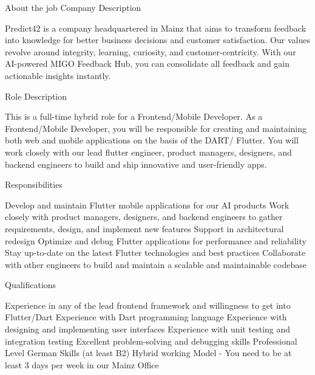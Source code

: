 About the job
Company Description

Predict42 is a company headquartered in Mainz that aims to transform feedback into knowledge for better business decisions and customer satisfaction. Our values revolve around integrity, learning, curiosity, and customer-centricity. With our AI-powered MIGO Feedback Hub, you can consolidate all feedback and gain actionable insights instantly. 



Role Description

This is a full-time hybrid role for a Frontend/Mobile Developer. As a Frontend/Mobile Developer, you will be responsible for creating and maintaining both web and mobile applications on the basis of the DART/ Flutter. You will work closely with our lead flutter engineer, product managers, designers, and backend engineers to build and ship innovative and user-friendly apps.



Responsibilities

Develop and maintain Flutter mobile applications for our AI products
Work closely with product managers, designers, and backend engineers to gather requirements, design, and implement new features
Support in architectural redesign
Optimize and debug Flutter applications for performance and reliability
Stay up-to-date on the latest Flutter technologies and best practices
Collaborate with other engineers to build and maintain a scalable and maintainable codebase


Qualifications

Experience in any of the lead frontend framework and willingness to get into Flutter/Dart
Experience with Dart programming language
Experience with designing and implementing user interfaces
Experience with unit testing and integration testing
Excellent problem-solving and debugging skills
Professional Level German Skills (at least B2)
Hybrid working Model - You need to be at least 3 days per week in our Mainz Office
